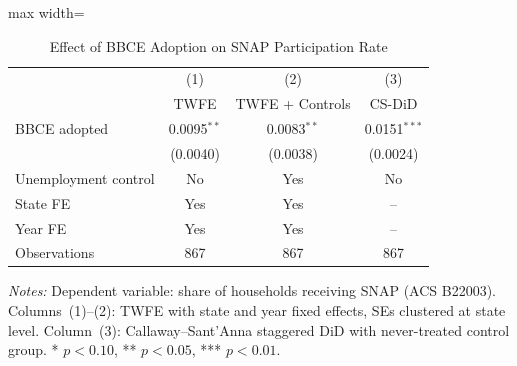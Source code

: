 
\begin{table}[H]
\centering
\caption{Effect of BBCE Adoption on SNAP Participation Rate}
\label{tab:main}
\begin{adjustbox}{max width=\textwidth}
\begin{threeparttable}
\begin{tabular}{lccc}
\toprule
& (1) & (2) & (3) \\
& TWFE & TWFE + Controls & CS-DiD \\
\midrule
BBCE adopted & 0.0095$^{**}$ & 0.0083$^{**}$ & 0.0151$^{***}$ \\
& (0.0040) & (0.0038) & (0.0024) \\[4pt]
Unemployment control & No & Yes & No \\
State FE & Yes & Yes & -- \\
Year FE & Yes & Yes & -- \\
Observations & 867 & 867 & 867 \\
\bottomrule
\end{tabular}
\begin{tablenotes}[flushleft]
\small
\item \textit{Notes:} Dependent variable: share of households receiving SNAP (ACS B22003). Columns~(1)--(2): TWFE with state and year fixed effects, SEs clustered at state level. Column~(3): Callaway--Sant'Anna staggered DiD with never-treated control group. * $p<0.10$, ** $p<0.05$, *** $p<0.01$.
\end{tablenotes}
\end{threeparttable}
\end{adjustbox}
\end{table}

